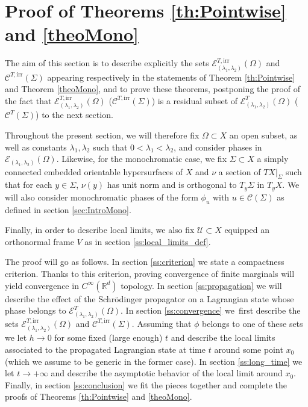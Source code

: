 \documentclass[JEP,XML,SOM,Unicode,published]{cedram}
\let\mathcal\mathscr
\newcommand{\irr}{\mathrm{irr}}
\theoremstyle{plain}
\theoremstyle{definition}
\newcommand{\R}{\mathbb{R}}
\def\calC{\mathcal{C}}
\def\calE{\mathcal{E}}
\def\calU{\mathcal{U}}
\begin{document}
\section{Proof of Theorems \ref{th:Pointwise} and \ref{theoMono}}\label{sec:MainProof}
The aim of this section is to describe explicitly the sets $\mathcal{E}^{T,\irr}_{(\lambda_1,\lambda_2)}(\Omega)$ and $\calC^{T,\irr}(\Sigma)$ appearing respectively in the statements of Theorem \ref{th:Pointwise} and Theorem \ref{theoMono}, and to prove these theorems, postponing the proof of the fact that $\mathcal{E}^{T,\irr}_{(\lambda_1,\lambda_2)}(\Omega)$ (\resp $\calC^{T,\irr}(\Sigma)$) is a residual subset of $\mathcal{E}^{T}_{(\lambda_1,\lambda_2)}(\Omega)$ (\resp $\calC^{T}(\Sigma)$) to the next section.

Throughout the present section, we will therefore fix $\Omega\subset X$ an open subset, as well as constants $\lambda_1,\lambda_2$ such that $0<\lambda_1<\lambda_2$, and consider phases in $\calE_{(\lambda_1,\lambda_2)}(\Omega)$. Likewise, for the monochromatic case, we fix $\Sigma\subset X$ a simply connected embedded orientable hypersurfaces of $X$ and $\nu$ a section of $TX|_\Sigma$ such that for each $y\in\Sigma$, $\nu(y)$ has unit norm and is orthogonal to $T_y\Sigma$ in $T_yX$. We will also consider monochromatic phases of the form $\phi_u$ with $u\in\calC(\Sigma)$ as defined in section \ref{sec:IntroMono}.

Finally, in order to describe local limits, we also fix $\calU\subset X$ equipped an orthonormal frame $V$ as in section \ref{ss:local_limits_def}.

The proof will go as follows. In section \ref{ss:criterion} we state a compactness criterion. Thanks to this criterion, proving convergence of finite marginals will yield convergence in $C^\infty(\R^d)$ topology. In section \ref{ss:propagation} we will describe the effect of the Schrödinger propagator on a Lagrangian state whose phase belongs to $\calE^T_{(\lambda_1,\lambda_2)}(\Omega)$. In section \ref{ss:convergence} we~first describe the sets $\calE^{T,\irr}_{(\lambda_1,\lambda_2)}(\Omega)$ and $\calC^{T,\irr}(\Sigma)$. Assuming that $\phi$ belongs to one of these sets we let $h\to 0$ for some fixed (large enough) $t$ and describe the local limits associated to the propagated Lagrangian state at time $t$ around some point $x_0$ (which we assume to be generic in the former case). In section \ref{ss:long_time} we let $t\to+\infty$ and describe the asymptotic behavior of the local limit around $x_0$. Finally, in section \ref{ss:conclusion} we fit the pieces together and complete the proofs of Theorems \ref{th:Pointwise} and \ref{theoMono}.
\end{document}
